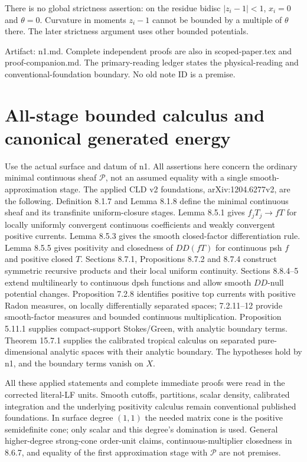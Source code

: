 \documentclass[11pt]{article}
\begin{document}
There is no global strictness assertion: on the residue bidisc $|z_i-1|<1$, $x_i=0$ and $\theta=0$. Curvature in moments $z_i-1$ cannot be bounded by a multiple of $\theta$ there. The later strictness argument uses other bounded potentials.

Artifact: n1.md. Complete independent proofs are also in scoped-paper.tex and proof-companion.md. The primary-reading ledger states the physical-reading and conventional-foundation boundary. No old note ID is a premise.


\section*{All-stage bounded calculus and canonical generated energy}

Use the actual surface and datum of n1. All assertions here concern the ordinary minimal continuous sheaf $\mathscr P$, not an assumed equality with a single smooth-approximation stage. The applied CLD v2 foundations, arXiv:1204.6277v2, are the following. Definition 8.1.7 and Lemma 8.1.8 define the minimal continuous sheaf and its transfinite uniform-closure stages. Lemma 8.5.1 gives $f_jT_j\to fT$ for locally uniformly convergent continuous coefficients and weakly convergent positive currents. Lemma 8.5.3 gives the smooth closed-factor differentiation rule. Lemma 8.5.5 gives positivity and closedness of $DD(fT)$ for continuous psh $f$ and positive closed $T$. Sections 8.7.1, Propositions 8.7.2 and 8.7.4 construct symmetric recursive products and their local uniform continuity. Sections 8.8.4--5 extend multilinearly to continuous dpsh functions and allow smooth $DD$-null potential changes. Proposition 7.2.8 identifies positive top currents with positive Radon measures, on locally differentially separated spaces; 7.2.11--12 provide smooth-factor measures and bounded continuous multiplication. Proposition 5.11.1 supplies compact-support Stokes/Green, with analytic boundary terms. Theorem 15.7.1 supplies the calibrated tropical calculus on separated pure-dimensional analytic spaces with their analytic boundary. The hypotheses hold by n1, and the boundary terms vanish on $X$.

All these applied statements and complete immediate proofs were read in the corrected literal-LF units. Smooth cutoffs, partitions, scalar density, calibrated integration and the underlying positivity calculus remain conventional published foundations. In surface degree $(1,1)$ the needed matrix cone is the positive semidefinite cone; only scalar and this degree's domination is used. General higher-degree strong-cone order-unit claims, continuous-multiplier closedness in 8.6.7, and equality of the first approximation stage with $\mathscr P$ are not premises.
\end{document}
